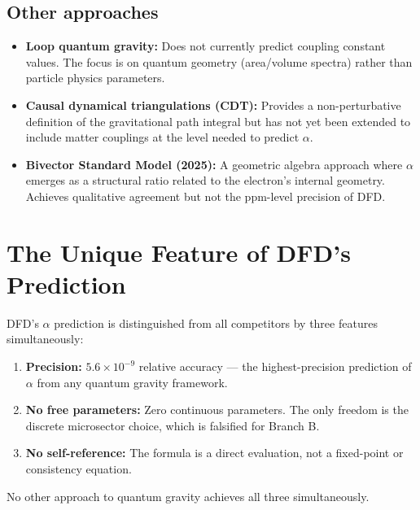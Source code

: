 \documentclass[12pt,a4paper]{article}
\begin{document}
\subsection{Other approaches}

\begin{itemize}
\item \textbf{Loop quantum gravity:} Does not currently predict coupling constant values. The focus is on quantum geometry (area/volume spectra) rather than particle physics parameters.

\item \textbf{Causal dynamical triangulations (CDT):} Provides a non-perturbative definition of the gravitational path integral but has not yet been extended to include matter couplings at the level needed to predict $\alpha$.

\item \textbf{Bivector Standard Model (2025):} A geometric algebra approach where $\alpha$ emerges as a structural ratio related to the electron's internal geometry. Achieves qualitative agreement but not the ppm-level precision of DFD.
\end{itemize}

\section{The Unique Feature of DFD's Prediction}

DFD's $\alpha$ prediction is distinguished from all competitors by three features simultaneously:

\begin{enumerate}
\item \textbf{Precision:} $5.6 \times 10^{-9}$ relative accuracy --- the highest-precision prediction of $\alpha$ from any quantum gravity framework.
\item \textbf{No free parameters:} Zero continuous parameters. The only freedom is the discrete microsector choice, which is falsified for Branch B.
\item \textbf{No self-reference:} The formula is a direct evaluation, not a fixed-point or consistency equation.
\end{enumerate}

No other approach to quantum gravity achieves all three simultaneously.
\end{document}

